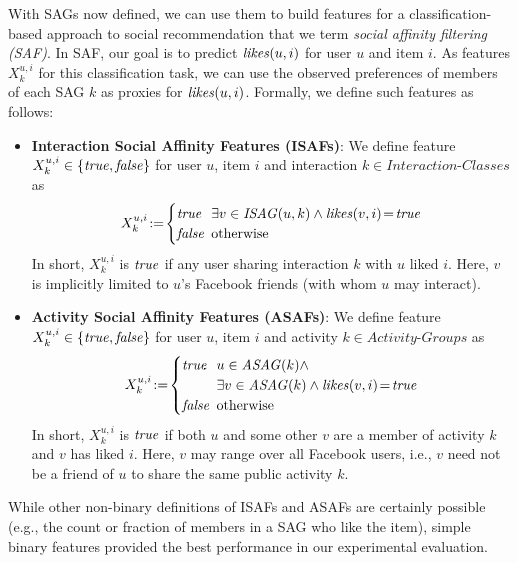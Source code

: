\label{ssec:SAfeature}

With SAGs now defined, we can use them to build features for a
classification-based approach to social recommendation that we term
\emph{social affinity filtering (SAF)}.  In SAF, our goal is to
predict $\like(u,i)$ for user $u$ and item $i$.  As features
$X^{u,i}_k$ for this classification task, we can use the observed
preferences of members of each SAG $k$ as proxies for $\like(u,i)$.
Formally, we define such features as follows:

\begin{itemize} 
\item \textbf{Interaction Social Affinity Features (ISAFs)}: 
We define feature $X^{u,i}_k \in \{ \true, \false \}$ for user $u$, item $i$ and interaction
$k \in \textit{Interaction-Classes}$ as
  \begin{equation*}
   X^{u,i}_{k} \! := \!
      \begin{cases}
   		\true  \!\!\! & \exists v \in \mathit{ISAG}(u,k) \wedge \likes(v,i)\!=\!\true\\ 
   		\false \!\!\! & \text{otherwise}
      \end{cases}
  \end{equation*}
   In short, $X^{u,i}_{k}$ is $\true$ if any user sharing interaction $k$ with $u$ liked $i$.
   Here, $v$ is implicitly limited to $u$'s Facebook friends (with whom $u$
   may interact).
\item \textbf{Activity Social Affinity Features (ASAFs)}: 
We define feature $X^{u,i}_k \in \{ \true, \false \}$ for user $u$, item $i$ and activity
$k \in \textit{Activity-Groups}$ as
  \begin{equation*}
   X^{u,i}_{k} \! := \! 
      \begin{cases}
   		\true  \!\!\! & u \in \mathit{ASAG}(k) \wedge \\
                              & \exists v \in \mathit{ASAG}(k) \wedge \likes(v,i)\!=\!\true\\
   		\false \!\!\! & \text{otherwise}
      \end{cases}
  \end{equation*}
  In short, $X^{u,i}_{k}$ is $\true$ if both $u$ and some other $v$ are a member of activity $k$
  and $v$ has liked $i$.  Here, $v$ may range over all Facebook users, 
  i.e., $v$ need not be a friend of $u$ to share the same public activity $k$.
\end{itemize}

While other non-binary definitions of ISAFs and ASAFs are certainly
possible (e.g., the count or fraction of members in a SAG who like the
item), simple binary features provided the best performance in our
experimental evaluation.

